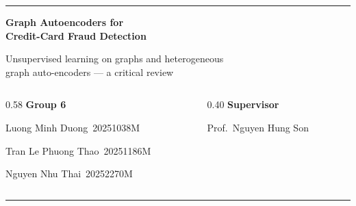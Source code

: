 \documentclass[10pt,aspectratio=169]{beamer}
\begin{document}
{\begin{frame}[plain]
  \vfill
  {\color{mAccent}\rule{\linewidth}{2pt}}\par
  \vspace{0.20cm}
  {\color{white}\fontsize{24}{29}\selectfont\bfseries
    Graph Autoencoders for\\ Credit-Card Fraud Detection\par}
  \vspace{0.16cm}
  {\color{tSub}\large Unsupervised learning on graphs and heterogeneous\\
    graph auto-encoders --- a critical review\par}
  \vfill

  \begin{columns}[T,onlytextwidth]
    \begin{column}{0.58\textwidth}
      {\color{mAccent}\footnotesize\textbf{Group 6}}\par
      \vspace{3pt}
      {\color{white} Luong Minh Duong}~{\footnotesize\color{tSub}20251038M}\par
      {\color{white} Tran Le Phuong Thao}~{\footnotesize\color{tSub}20251186M}\par
      {\color{white} Nguyen Nhu Thai}~{\footnotesize\color{tSub}20252270M}\par
      \vspace{3pt}
    \end{column}
    \begin{column}{0.40\textwidth}
      {\color{mAccent}\footnotesize\textbf{Supervisor}}\par
      \vspace{3pt}
      {\color{tSup} Prof.\ Nguyen Hung Son}\par
      \vspace{3pt}
    \end{column}
  \end{columns}

  \vfill
  {\color{mAccent}\rule{\linewidth}{0.6pt}}\par
  \vspace{2pt}
\end{frame}
}
\end{document}
